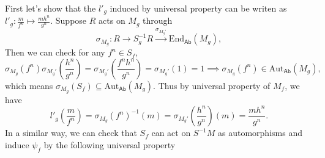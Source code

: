 \begin{prf}
First let's show that the $l'_g$ induced by universal property can be writen as $l'_g:\frac{m}{f^n}\mapsto\frac{mh^n}{g^n}$. Suppose $R$ acts on $M_g$ through
\[
    \sigma_{M_g}:R\xrightarrow{}S^{-1}_gR\xrightarrow{\sigma_{M_g'}}\mathrm{End}_{\mathsf{Ab}}(M_g),
\]
Then we can check for any $f^n \in S_f$,
\[
    \sigma_{M_g}(f^n)\sigma_{M_g'}\left(\frac{h^n}{g^n}\right)=\sigma_{M_g'}\left(\frac{f^nh^n}{g^n}\right)=\sigma_{M_g'}\left(1\right)=1\implies \sigma_{M_g}(f^n)\in \mathrm{Aut}_{\mathsf{Ab}}(M_g),
\]
which means $\sigma_{M_g}(S_f)\subseteq  \mathrm{Aut}_{\mathsf{Ab}}(M_g)$. Thus by universal property of $M_f$, we have
\[
    l'_g\left(\frac{m}{f^n}\right)=\sigma_{M_g}(f^n)^{-1}(m)=\sigma_{M_g'}\left(\frac{h^n}{g^n}\right)(m)=\frac{mh^n}{g^n}.
\]
In a similar way, we can check that $S_f$ can act on $S^{-1}M$ as automorphisms and induce $\psi_f$ by the following universal property
\begin{center}
    \begin{tikzcd}[ampersand replacement=\&]
     

\end{tikzcd}
\end{center}
\end{prf}
